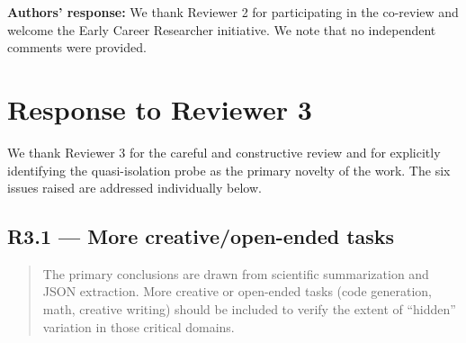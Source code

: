 \documentclass[11pt,a4paper]{article}
\newenvironment{revquote}{%
  \begin{quote}\small\itshape\color{revgray}
}{%
  \end{quote}
}
\newcommand{\response}[1]{\par\noindent\textbf{\color{revgreen}Authors' response:} #1\par}
\begin{document}
\response{We thank Reviewer 2 for participating in the co-review and welcome the Early Career Researcher initiative. We note that no independent comments were provided.}

\newpage
\section*{Response to Reviewer 3}

We thank Reviewer 3 for the careful and constructive review and for explicitly identifying the quasi-isolation probe as the primary novelty of the work. The six issues raised are addressed individually below.

\subsection*{R3.1 --- More creative/open-ended tasks}

\begin{revquote}
The primary conclusions are drawn from scientific summarization and JSON extraction. More creative or open-ended tasks (code generation, math, creative writing) should be included to verify the extent of ``hidden'' variation in those critical domains.
\end{revquote}
\end{document}
